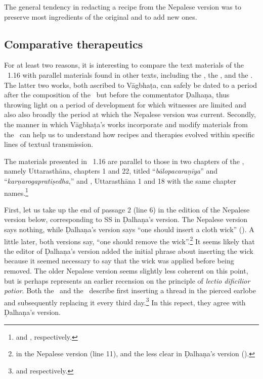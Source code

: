  The general tendency in redacting a recipe from the Nepalese version was to
preserve most ingredients of the original and to add new ones.
    

\subsection{Comparative therapeutics} 

For at least two reasons, it is interesting to compare the text materials of the
\SS~1.16 with parallel materials found in other texts, including the \CS, the \AS,
and the \AHS. The latter two works, both ascribed to Vāgbhaṭa, can safely be dated
to a period after the composition of the \SS\ but before the commentator Ḍalhaṇa,
thus throwing light on a period of development for which witnesses are limited and
also also broadly the period at which the Nepalese version was current. Secondly,
the manner in which Vāgbhaṭa's works incorporate and modify materials from the
\SS\ can help us to understand how recipes and therapies evolved within specific
lines of textual transmission.

The materials presented in \SS~1.16 are parallel to those in two chapters of the
\AS, namely Uttarasthāna, chapters 1 and 22, titled “\emph{bālopacaraṇīya}” and
“\emph{karṇarogapratiṣedha},” and \AHS, Uttarasthāna 1 and 18 with the same chapter
names.\footnote{\cite[619--629 and 734--744]{atha-1980} and \cite[777--781 and  
837--841]{kunt-1939}, respectively.}

First, let us take up the end of passage 2 (line 6) in the edition of the Nepalese
version below, corresponding to SS  in Ḍalhaṇa's version. %
The Nepalese version says nothing, while Ḍalhaṇa's version says “one should insert
a cloth wick” ().  A little later, both versions say,
“one should remove the wick”.\footnote{ in the Nepalese
    version (line 11), and the less clear  in Ḍalhaṇa's
    version ().}  It seems likely that the editor of Ḍalhaṇa's version
    added the initial phrase about inserting the wick because it seemed necessary to
    say that the wick was applied before being removed.  The older Nepalese version
    seems slightly less coherent on this point, but is perhaps represents an earlier
    recension on the principle of \emph{lectio dificilior potior}. %
    Both the \AS\ and the \AHS\ describe first inserting a thread in the pierced
    earlobe and subsequently replacing it every third
    day.\footnote{ and  respectively.} In this
        repect, they agree  with Ḍalhaṇa’s version.


